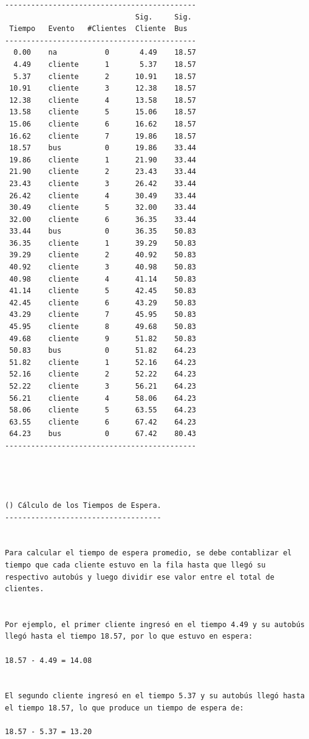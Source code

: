 \begin{verbatim}
--------------------------------------------
                              Sig.     Sig.
 Tiempo   Evento   #Clientes  Cliente  Bus
--------------------------------------------
  0.00    na           0       4.49    18.57
  4.49    cliente      1       5.37    18.57
  5.37    cliente      2      10.91    18.57
 10.91    cliente      3      12.38    18.57
 12.38    cliente      4      13.58    18.57
 13.58    cliente      5      15.06    18.57
 15.06    cliente      6      16.62    18.57
 16.62    cliente      7      19.86    18.57
 18.57    bus          0      19.86    33.44
 19.86    cliente      1      21.90    33.44
 21.90    cliente      2      23.43    33.44
 23.43    cliente      3      26.42    33.44
 26.42    cliente      4      30.49    33.44
 30.49    cliente      5      32.00    33.44
 32.00    cliente      6      36.35    33.44
 33.44    bus          0      36.35    50.83
 36.35    cliente      1      39.29    50.83
 39.29    cliente      2      40.92    50.83
 40.92    cliente      3      40.98    50.83
 40.98    cliente      4      41.14    50.83
 41.14    cliente      5      42.45    50.83
 42.45    cliente      6      43.29    50.83
 43.29    cliente      7      45.95    50.83
 45.95    cliente      8      49.68    50.83
 49.68    cliente      9      51.82    50.83
 50.83    bus          0      51.82    64.23
 51.82    cliente      1      52.16    64.23
 52.16    cliente      2      52.22    64.23
 52.22    cliente      3      56.21    64.23
 56.21    cliente      4      58.06    64.23
 58.06    cliente      5      63.55    64.23
 63.55    cliente      6      67.42    64.23
 64.23    bus          0      67.42    80.43
--------------------------------------------




() Cálculo de los Tiempos de Espera.
------------------------------------


Para calcular el tiempo de espera promedio, se debe contablizar el tiempo que cada cliente estuvo en la fila hasta que llegó su respectivo autobús y luego dividir ese valor entre el total de clientes.


Por ejemplo, el primer cliente ingresó en el tiempo 4.49 y su autobús llegó hasta el tiempo 18.57, por lo que estuvo en espera:

18.57 - 4.49 = 14.08


El segundo cliente ingresó en el tiempo 5.37 y su autobús llegó hasta el tiempo 18.57, lo que produce un tiempo de espera de:

18.57 - 5.37 = 13.20



\end{verbatim}
